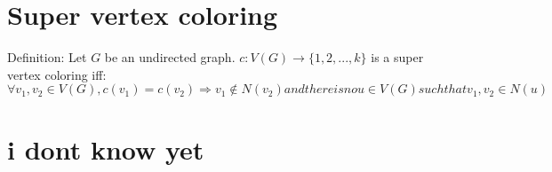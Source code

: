 \documentclass[12pt]{article}
\begin{document}
\section{Super vertex coloring}

Definition: Let $G$ be an undirected graph. $c: V(G) \rightarrow \{1, 2, ... , k\}$ 
is a super vertex coloring iff:
$\forall v_1, v_2 \in V(G), c(v_1) = c(v_2) \Rightarrow v_1 \notin N(v_2) 
and there is no u \in V(G) such that v_1, v_2 \in N(u)$

\section{i dont know yet}
\end{document}
